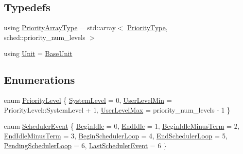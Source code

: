 \subsection*{Typedefs}
\begin{DoxyCompactItemize}
\item 
using \hyperlink{namespacevt_1_1sched_a2dbd1daff26f79efbff3f418ad9b2a8b}{Priority\+Array\+Type} = std\+::array$<$ \hyperlink{namespacevt_a86bff9f556eb761b27fc8600d006ac04}{Priority\+Type}, sched\+::priority\+\_\+num\+\_\+levels $>$
\item 
using \hyperlink{namespacevt_1_1sched_a3f19a4714fc5d9f901b45665a9d794d5}{Unit} = \hyperlink{structvt_1_1sched_1_1_base_unit}{Base\+Unit}
\end{DoxyCompactItemize}
\subsection*{Enumerations}
\begin{DoxyCompactItemize}
\item 
enum \hyperlink{namespacevt_1_1sched_a2857a110a140d0a9f77d374c90eb498b}{Priority\+Level} \{ \hyperlink{namespacevt_1_1sched_a2857a110a140d0a9f77d374c90eb498ba17c6729b868f4c633d17ba760a875cae}{System\+Level} = 0, 
\hyperlink{namespacevt_1_1sched_a2857a110a140d0a9f77d374c90eb498baee78e11eb2efcad3e8f54d60271ef6b6}{User\+Level\+Min} = Priority\+Level\+:\+:System\+Level + 1, 
\hyperlink{namespacevt_1_1sched_a2857a110a140d0a9f77d374c90eb498bada7b4271cb9b277f573951caa83f8128}{User\+Level\+Max} = priority\+\_\+num\+\_\+levels -\/ 1
 \}
\item 
enum \hyperlink{namespacevt_1_1sched_a54756ec39b60951d6765fcfa692d1616}{Scheduler\+Event} \{ \newline
\hyperlink{namespacevt_1_1sched_a54756ec39b60951d6765fcfa692d1616a8bbf26915a1dd443fc831173eef2a5c2}{Begin\+Idle} = 0, 
\hyperlink{namespacevt_1_1sched_a54756ec39b60951d6765fcfa692d1616a18303c08c4ee52b363809a1b302fd807}{End\+Idle} = 1, 
\hyperlink{namespacevt_1_1sched_a54756ec39b60951d6765fcfa692d1616a72d613b13201f766d3fc9d15c41ad6b5}{Begin\+Idle\+Minus\+Term} = 2, 
\hyperlink{namespacevt_1_1sched_a54756ec39b60951d6765fcfa692d1616addd8bd380a885eec328be20b317db5f1}{End\+Idle\+Minus\+Term} = 3, 
\newline
\hyperlink{namespacevt_1_1sched_a54756ec39b60951d6765fcfa692d1616aef46509b0036c1d7ed074229a9d44fdf}{Begin\+Scheduler\+Loop} = 4, 
\hyperlink{namespacevt_1_1sched_a54756ec39b60951d6765fcfa692d1616ac5e4d564fc096f6e9e7a4e43347dc98c}{End\+Scheduler\+Loop} = 5, 
\hyperlink{namespacevt_1_1sched_a54756ec39b60951d6765fcfa692d1616aa75e330bc5c4f9fd26dad998d5b20df4}{Pending\+Scheduler\+Loop} = 6, 
\hyperlink{namespacevt_1_1sched_a54756ec39b60951d6765fcfa692d1616a51c718670af733bf6cdb3c39ed9ce42d}{Last\+Scheduler\+Event} = 6
 \}
\end{DoxyCompactItemize}
